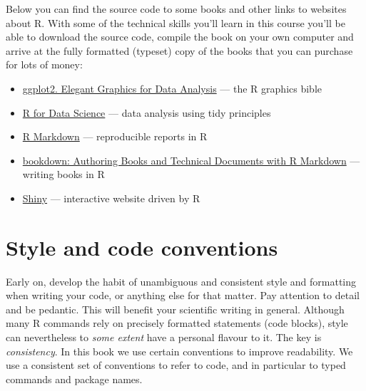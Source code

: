 \documentclass[
]{book}
\providecommand{\tightlist}{%
  \setlength{\itemsep}{0pt}\setlength{\parskip}{0pt}}
\begin{document}
Below you can find the source code to some books and other links to websites about R. With some of the technical skills you'll learn in this course you'll be able to download the source code, compile the book on your own computer and arrive at the fully formatted (typeset) copy of the books that you can purchase for lots of money:

\begin{itemize}
\tightlist
\item
  \href{https://github.com/hadley/ggplot2-book}{ggplot2. Elegant Graphics for Data Analysis} --- the R graphics bible
\item
  \href{http://r4ds.had.co.nz/workflow-basics.html}{R for Data Science} --- data analysis using tidy principles
\item
  \href{http://rmarkdown.rstudio.com}{R Markdown} --- reproducible reports in R
\item
  \href{https://bookdown.org/yihui/bookdown}{bookdown: Authoring Books and Technical Documents with R Markdown} --- writing books in R
\item
  \href{https://shiny.rstudio.com}{Shiny} --- interactive website driven by R
\end{itemize}

\hypertarget{style-and-code-conventions}{%
\section{Style and code conventions}\label{style-and-code-conventions}}

Early on, develop the habit of unambiguous and consistent style and formatting when writing your code, or anything else for that matter. Pay attention to detail and be pedantic. This will benefit your scientific writing in general. Although many R commands rely on precisely formatted statements (code blocks), style can nevertheless to \emph{some extent} have a personal flavour to it. The key is \emph{consistency}. In this book we use certain conventions to improve readability. We use a consistent set of conventions to refer to code, and in particular to typed commands and package names.
\end{document}
